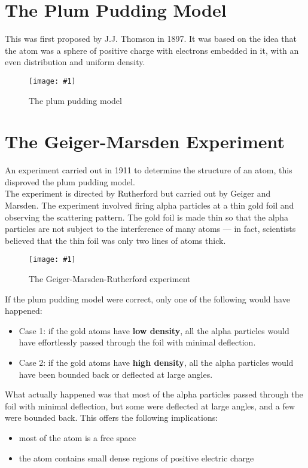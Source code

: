 \documentclass[a4paper,12pt]{article}
\let\oldsection\section
\renewcommand\section{\clearpage\oldsection}
\newcommand{\lb}{\\[8pt]}
\newcommand{\img}[4]{\begin{center}
  \begin{figure}[H]
    \centering
    \texttt{[image: \#1]}
    \caption{#3}
    \label{fig:#4}
  \end{figure}
\end{center}}
\begin{document}
\pagebreak

\section{The Plum Pudding Model}
This was first proposed by J.J. Thomson in 1897. It was based on the idea that the atom was a sphere of positive charge with electrons embedded in it, with an even distribution and uniform density.

\img{plumpudding.png}{0.4}{The plum pudding model}{plumpudding}

\section{The Geiger-Marsden Experiment}
An experiment carried out in 1911 to determine the structure of an atom, this disproved the plum pudding model.\lb
The experiment is directed by Rutherford but carried out by Geiger and Marsden. The experiment involved firing alpha particles at a thin gold foil and observing the scattering pattern. The gold foil is made thin so that the alpha particles are not subject to the interference of many atoms --- in fact, scientists believed that the thin foil was only two lines of atoms thick.

\img{goldfoilexpt.png}{0.7}{The Geiger-Marsden-Rutherford experiment}{goldfoil}

If the plum pudding model were correct, only one of the following would have happened:
\begin{itemize}
  \item Case 1: if the gold atoms have \textbf{low density}, all the alpha particles would have effortlessly passed through the foil with minimal deflection.
  \item Case 2: if the gold atoms have \textbf{high density}, all the alpha particles would have been bounded back or deflected at large angles.
\end{itemize}

\pagebreak

What actually happened was that most of the alpha particles passed through the foil with minimal deflection, but some were deflected at large angles, and a few were bounded back. This offers the following implications:
\begin{itemize}
  \item most of the atom is a free space
  \item the atom contains small dense regions of positive electric charge
\end{itemize}
\end{document}
